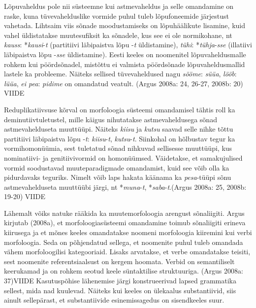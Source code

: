 \documentclass[12pt]{article}
\begin{document}
Lõpuvaheldus pole nii süsteemne kui astmevaheldus ja selle omandamine on raske, kuna tüvevahelduslike vormide puhul tuleb lõpufoneemide järjestust vahetada. Lihtsaim viis sõnade moodustamiseks on lõpuhäälikute lisamine, kuid vahel üldistatakse muutesufiksit ka sõnadele, kus see ei ole normikohane, nt \emph{kauss}: *\emph{kausi}-\emph{t} (partitiivi läbipaistva lõpu -\emph{t} üldistamine), \emph{tühi}: *\emph{tühja}-\emph{sse} (illatiivi läbipaistva lõpu -\emph{sse} üldistamine). Eesti keeles on noomenitel lõpuvaheldusmalle rohkem kui pöördsõnadel, mistõttu ei valmista pöördsõnade lõpuvaheldusmallid lastele ka probleeme. Näiteks sellised tüvevaheldused nagu \emph{sööme}: \emph{süüa}, \emph{lööb}: \emph{lüüa}, \emph{ei pea}: \emph{pidime} on omandatud veatult. (Argus 2008a: 24, 26-27, 2008b: 20) VIIDE

Reduplikatiivsuse kõrval on morfoloogia süsteemi omandamisel tähtis roll ka deminutiivtuletustel, mille käigus nihutatakse astmevaheldusega sõnad astmevahelduseta muuttüüpi. Näiteks \emph{kiisu} ja \emph{kutsu} saavad selle nihke tõttu partitiivi läbipaistva lõpu -\emph{t}: \emph{kiisu}-\emph{t}, \emph{kutsu}-\emph{t}. Siinkohal on hõlbustav tegur ka vormihomonüümia, sest tuletatud sõnad nihkuvad sellisesse muuttüüpi, kus nominatiivi- ja genitiivivormid on homonüümsed. Väidetakse, et samakujulised vormid soodustavad muuteparadigmade omandamist, kuid see võib olla ka pidurdavaks teguriks. Nimelt võib laps hakata käänama ka \emph{pesa}-tüüpi sõnu astmevahelduseta muuttüübi järgi, nt *\emph{muna}-\emph{t}, *\emph{saba}-\emph{t}.(Argus 2008a: 25, 2008b: 19-20) VIIDE

Lähemalt võiks natuke rääkida ka muutemorfoloogia arengust sõnaliigiti. Argus kirjutab (2008a), et morfoloogiasüsteemi omandamine toimub sõnaliigiti erineva kiirusega ja et mõnes keeles omandatakse noomeni morfoloogia kiiremini kui verbi morfoloogia. Seda on põhjendatud sellega, et noomenite puhul tuleb omandada vähem morfoloogilisi kategooriaid. Lisaks arvatakse, et verbe omandatakse teisiti, sest noomenite referentsiaalsust on kergem hoomata. Verbid on semantiliselt keerukamad ja on rohkem seotud keele süntaktilise struktuuriga. (Argus 2008a: 37)VIIDE Kasutuspõhise lähenemise järgi konstrueerivad lapsed grammatika sellest, mida nad kuulevad. Näiteks kui keeles on ülekaalus substantiivid, siis ainult sellepärast, et substantiivide esinemissagedus on sisendkeeles suur. 
\end{document}
